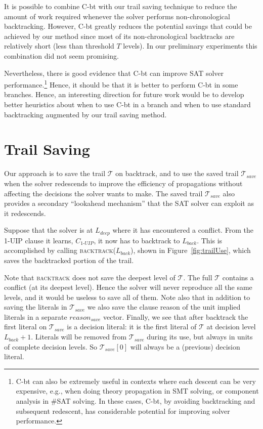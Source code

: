 \documentclass[runningheads]{llncs}
\newcommand{\sat}{SAT\xspace}
\newcommand{\trail}{\ensuremath{\mathcal{T}}}
\newcommand{\uipcls}{C_{\textit{1-UIP}}}
\newcommand{\deepestLvl}{L_{\textit{deep}}}
\newcommand{\btL}{L_{\textit{back}}}
\newcommand{\cbt}{C-bt\xspace}
\newcommand{\trailsave}{\trail_{\mathit{save}}}
\newcommand{\bt}{\textsc{backtrack}\xspace}
\begin{document}
It is possible to combine \cbt with our trail saving technique to
reduce the amount of work required whenever the solver performs
non-chronological backtracking. However, \cbt greatly reduces the
potential savings that could be achieved by our method since most of
its non-chronological backtracks are relatively short (less than
threshold $T$ levels). In our preliminary experiments this combination
did not seem promising.

Nevertheless, there is good evidence that \cbt can improve \sat solver
performance.\footnote{\cbt can also be extremely useful in contexts
  where each descent can be very expensive, e.g., when doing theory
  propagation in SMT solving, or component analysis in \#\sat
  solving. In these cases, \cbt, by avoiding backtracking and
  subsequent redescent, has considerable potential for improving
  solver performance.} Hence, it should be that it is better to
perform \cbt in some branches. Hence, an interesting direction for
future work would be to develop better heuristics about when to use
\cbt in a branch and when to use standard backtracking augmented by
our trail saving method.

\section{Trail Saving}
Our approach is to save the trail $\trail$ on backtrack, and to use
the saved trail $\trailsave$ when the solver redescends to improve the
efficiency of propagations without affecting the decisions the solver
wants to make. The saved trail $\trailsave$ also provides a secondary
``lookahead mechanism'' that the \sat solver can exploit as it
redescends.

Suppose that the solver is at $\deepestLvl$ where it has encountered a
conflict. From the 1-UIP clause it learns, $\uipcls$, it now has to
backtrack to $\btL$. This is accomplished by calling
\textsc{backtrack($\btL$)}, shown in Figure~\ref{fig:trailUse}, which
saves the backtracked portion of the trail.

Note that \bt does not save the deepest level of $\trail$. The full
$\trail$ contains a conflict (at its deepest level). Hence the solver
will never reproduce all the same levels, and it would be useless to
save all of them. Note also that in addition to saving the literals in
$\trailsave$ we also save the clause reason of the unit implied
literals in a separate $\mathit{reason_{save}}$ vector. Finally, we
see that after backtrack the first literal on $\trailsave$ is a
decision literal: it is the first literal of $\trail$ at decision
level $\btL+1$. Literals will be removed from $\trailsave$ during its
use, but always in units of complete decision levels. So
$\trailsave[0]$ will always be a (previous) decision literal.
\end{document}

